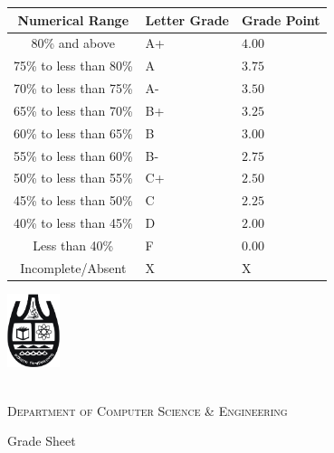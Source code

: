 \documentclass[11pt]{article}
\begin{document}
         \begin{table}[ht]
\begin{minipage}[m]{0.3\linewidth} %
\vspace*{-3.0cm} 
\begin{tabular}{ |c|>{\centering}m{0.9cm}|m{0.91cm}|}%
	\hline {\bf Numerical Range} & {\bf Letter Grade} & {\bf Grade Point} \\
	\hline   80\% and above & A+ & $4.00$  \\ 
	\hline   75\% to less than 80\% &  A & $3.75$\\ 
	\hline   70\% to less than 75\% &  A- & $3.50$ \\ 
	\hline   65\% to less than 70\% &  B+ & $3.25$\\ 
	\hline   60\% to less than 65\% &  B  & $3.00$\\ 
	\hline   55\% to less than 60\% &  B- & $2.75$\\ 
	\hline   50\% to less than 55\% &  C+ & $2.50$\\ 
	\hline   45\% to less than 50\% &  C  & $2.25$\\
	\hline   40\% to less than 45\% &  D  & $2.00$\\
	\hline   Less than 40\%         &  F  & $0.00$\\ 
	\hline   Incomplete/Absent         &  X  & X\\ 
	\hline 
	
\end{tabular}

\end{minipage}
\hspace{0.3cm}
\begin{minipage}[b]{0.35\textwidth}
	\vspace*{.5in}
\centering \includegraphics[width=0.6in]{cu-logo.jpg}

\smallskip

\\
\textsc{Department of Computer Science \& Engineering}\\

\smallskip

{\large {\sc Grade Sheet}}\\


\end{minipage}
\end{table}
\end{document}
